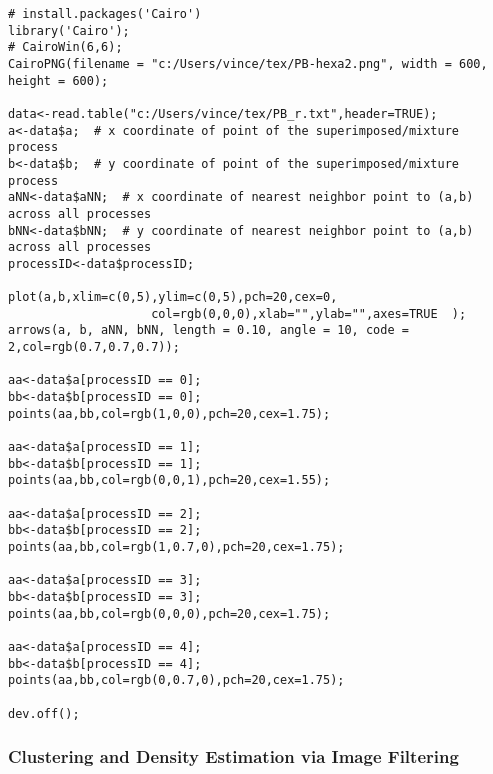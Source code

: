 \documentclass[10pt]{article}
\begin{document}
\begin{lstlisting}
# install.packages('Cairo')
library('Cairo');
# CairoWin(6,6);
CairoPNG(filename = "c:/Users/vince/tex/PB-hexa2.png", width = 600, height = 600);

data<-read.table("c:/Users/vince/tex/PB_r.txt",header=TRUE);
a<-data$a;  # x coordinate of point of the superimposed/mixture process 
b<-data$b;  # y coordinate of point of the superimposed/mixture process 
aNN<-data$aNN;  # x coordinate of nearest neighbor point to (a,b) across all processes
bNN<-data$bNN;  # y coordinate of nearest neighbor point to (a,b) across all processes
processID<-data$processID;

plot(a,b,xlim=c(0,5),ylim=c(0,5),pch=20,cex=0,
                    col=rgb(0,0,0),xlab="",ylab="",axes=TRUE  );
arrows(a, b, aNN, bNN, length = 0.10, angle = 10, code = 2,col=rgb(0.7,0.7,0.7));

aa<-data$a[processID == 0];
bb<-data$b[processID == 0];
points(aa,bb,col=rgb(1,0,0),pch=20,cex=1.75);

aa<-data$a[processID == 1];
bb<-data$b[processID == 1];
points(aa,bb,col=rgb(0,0,1),pch=20,cex=1.55);

aa<-data$a[processID == 2];
bb<-data$b[processID == 2];
points(aa,bb,col=rgb(1,0.7,0),pch=20,cex=1.75);

aa<-data$a[processID == 3];
bb<-data$b[processID == 3];
points(aa,bb,col=rgb(0,0,0),pch=20,cex=1.75);

aa<-data$a[processID == 4];
bb<-data$b[processID == 4];
points(aa,bb,col=rgb(0,0.7,0),pch=20,cex=1.75);

dev.off();

\end{lstlisting}

\subsubsection{Clustering and Density Estimation via Image Filtering}\label{plgd}
\end{document}
